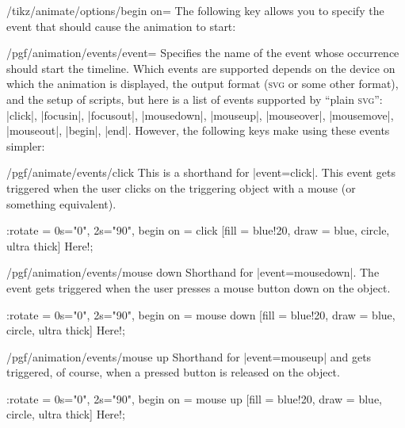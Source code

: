 \begin{key}{/tikz/animate/options/begin on=}
    The following key allows you to specify the event that should cause the
    animation to start:
    \begin{key}{/pgf/animation/events/event=}
        Specifies the name of the event whose occurrence should start the
        timeline. Which events are supported depends on the device on which the
        animation is displayed, the output format (\textsc{svg} or some other
        format), and the setup of scripts, but here is a list of events
        supported by ``plain \textsc{svg}'': |click|, |focusin|, |focusout|,
        |mousedown|,  |mouseup|, |mouseover|, |mousemove|, |mouseout|, |begin|,
        |end|. However, the following keys make using these events simpler:
        \begin{key}{/pgf/animate/events/click}
            This is a shorthand for |event=click|. This event gets triggered
            when the user clicks on the triggering object with a mouse (or
            something equivalent).
\begin{codeexample}[width=2cm,preamble={\usetikzlibrary{animations}}]
\tikz \node :rotate = { 0s="0", 2s="90", begin on = {click}}
  [fill = blue!20, draw = blue, circle, ultra thick] {Here!};
\end{codeexample}
        \end{key}
        \begin{key}{/pgf/animation/events/mouse down}
            Shorthand for |event=mousedown|. The event gets triggered when the
            user presses a mouse button down on the object.
\begin{codeexample}[width=2cm,preamble={\usetikzlibrary{animations}}]
\tikz \node :rotate = { 0s="0", 2s="90", begin on = {mouse down}}
  [fill = blue!20, draw = blue, circle, ultra thick] {Here!};
\end{codeexample}
        \end{key}
        \begin{key}{/pgf/animation/events/mouse up}
            Shorthand for |event=mouseup| and gets triggered, of course, when a
            pressed button is released on the object.
\begin{codeexample}[width=2cm,preamble={\usetikzlibrary{animations}}]
\tikz \node :rotate = { 0s="0", 2s="90", begin on = {mouse up} }
  [fill = blue!20, draw = blue, circle, ultra thick] {Here!};
\end{codeexample}
        \end{key}

\end{key}
\end{key}
